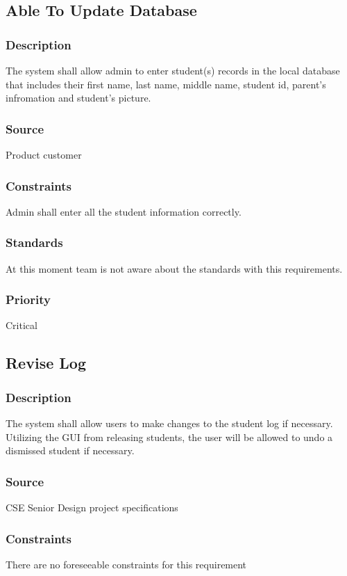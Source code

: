\subsection{Able To Update Database}
\subsubsection{Description}
\quad \quad The system shall allow admin to enter student(s) records in the local database that 
includes their first name, last name, middle name, student id, parent's infromation 
and student's picture. 
\subsubsection{Source}
\quad \quad Product customer
\subsubsection{Constraints}
\quad \quad Admin shall enter all the student information correctly.
\subsubsection{Standards}
\quad \quad At this moment team is not aware about the standards with this requirements.
\subsubsection{Priority}
\quad \quad Critical
\subsection{Revise Log}
\subsubsection{Description}
\quad \quad The system shall allow users to make changes to the student log if necessary. 
Utilizing the GUI from releasing students, the user will be allowed to undo a 
dismissed student if necessary.
\subsubsection{Source}
\quad \quad CSE Senior Design project specifications
\subsubsection{Constraints}
\quad \quad There are no foreseeable constraints for this requirement  
